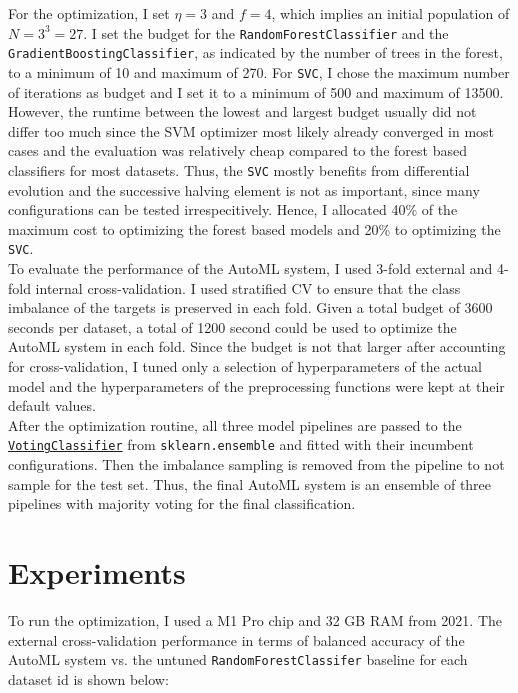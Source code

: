 \documentclass[11pt]{article}
\begin{document}
For the optimization, I set $\eta=3$ and $f=4$, which implies an initial population of $N=3^{3}=27$. I set the budget for the \texttt{RandomForestClassifier} and the \texttt{GradientBoostingClassifier}, as indicated by the number of trees in the forest, to a minimum of 10 and maximum of 270. For \texttt{SVC}, I chose the maximum number of iterations as budget and I set it to a minimum of 500 and maximum of 13500. However, the runtime between the lowest and largest budget usually did not differ too much since the SVM optimizer most likely already converged in most cases and the evaluation was relatively cheap compared to the forest based classifiers for most datasets. Thus, the \texttt{SVC} mostly benefits from differential evolution and the successive halving element is not as important, since many configurations can be tested irrespecitively. Hence, I allocated 40\% of the maximum cost to optimizing the forest based models and 20\% to optimizing the \texttt{SVC}. \\

To evaluate the performance of the AutoML system, I used 3-fold external and 4-fold internal cross-validation. I used stratified CV to ensure that the class imbalance of the targets is preserved in each fold. Given a total budget of 3600 seconds per dataset, a total of 1200 second could be used to optimize the AutoML system in each fold. Since the budget is not that larger after accounting for cross-validation, I tuned only a selection of hyperparameters of the actual model and the hyperparameters of the preprocessing functions were kept at their default values. \\

After the optimization routine, all three model pipelines are passed to the \href{https://scikit-learn.org/stable/modules/generated/sklearn.ensemble.VotingClassifier.html}{\texttt{VotingClassifier}} from \texttt{sklearn.ensemble} and fitted with their incumbent configurations. Then the imbalance sampling is removed from the pipeline to not sample for the test set. Thus, the final AutoML system is an ensemble of three pipelines with majority voting for the final classification. 

\section{Experiments}

To run the optimization, I used a M1 Pro chip and 32 GB RAM from 2021. The external cross-validation performance in terms of balanced accuracy of the AutoML system vs. the untuned \texttt{RandomForestClassifer} baseline for each dataset id is shown below:
\end{document}
